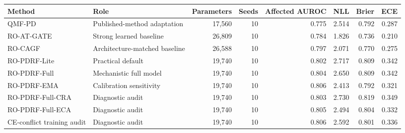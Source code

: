 \begin{tabular}{lp{}rrrrrr}
\toprule
Method & Role & Parameters & Seeds & Affected AUROC & NLL & Brier & ECE \\
\midrule
QMF-PD & Published-method adaptation & 17,560 & 10 & 0.775 & 2.514 & 0.792 & 0.287 \\
RO-AT-GATE & Strong learned baseline & 26,809 & 10 & 0.784 & 1.826 & 0.736 & 0.210 \\
RO-CAGF & Architecture-matched baseline & 26,588 & 10 & 0.797 & 2.071 & 0.770 & 0.275 \\
RO-PDRF-Lite & Practical default & 19,740 & 10 & 0.802 & 2.717 & 0.809 & 0.342 \\
RO-PDRF-Full & Mechanistic full model & 19,740 & 10 & 0.804 & 2.650 & 0.809 & 0.342 \\
RO-PDRF-EMA & Calibration sensitivity & 19,740 & 10 & 0.806 & 2.413 & 0.792 & 0.321 \\
RO-PDRF-Full-CRA & Diagnostic audit & 19,740 & 10 & 0.803 & 2.730 & 0.819 & 0.349 \\
RO-PDRF-Full-ECA & Diagnostic audit & 19,740 & 10 & 0.805 & 2.494 & 0.804 & 0.332 \\
CE-conflict training audit & Diagnostic audit & 19,740 & 10 & 0.806 & 2.592 & 0.801 & 0.336 \\
\bottomrule
\end{tabular}